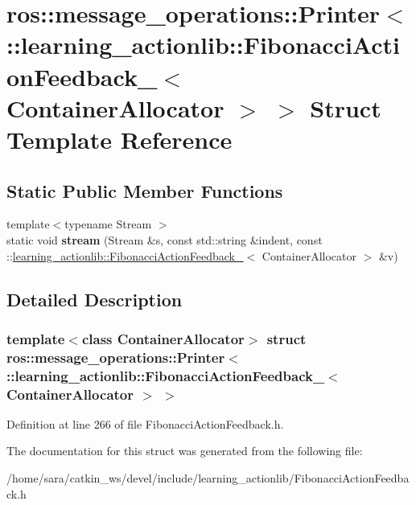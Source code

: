 \hypertarget{structros_1_1message__operations_1_1Printer_3_01_1_1learning__actionlib_1_1FibonacciActionFeedbab10a7c35099a1a330ccb0b34d632cc2e}{}\section{ros\+:\+:message\+\_\+operations\+:\+:Printer$<$ \+:\+:learning\+\_\+actionlib\+:\+:Fibonacci\+Action\+Feedback\+\_\+$<$ Container\+Allocator $>$ $>$ Struct Template Reference}
\label{structros_1_1message__operations_1_1Printer_3_01_1_1learning__actionlib_1_1FibonacciActionFeedbab10a7c35099a1a330ccb0b34d632cc2e}
\subsection*{Static Public Member Functions}
\begin{DoxyCompactItemize}
\item 
\mbox{\label{structros_1_1message__operations_1_1Printer_3_01_1_1learning__actionlib_1_1FibonacciActionFeedbab10a7c35099a1a330ccb0b34d632cc2e_a3f73b3e94f53fbf2d7cbad0ed370ce6e}} 
{\footnotesize template$<$typename Stream $>$ }\\static void {\bfseries stream} (Stream \&s, const std\+::string \&indent, const \+::\hyperlink{structlearning__actionlib_1_1FibonacciActionFeedback__}{learning\+\_\+actionlib\+::\+Fibonacci\+Action\+Feedback\+\_\+}$<$ Container\+Allocator $>$ \&v)
\end{DoxyCompactItemize}


\subsection{Detailed Description}
\subsubsection*{template$<$class Container\+Allocator$>$\newline
struct ros\+::message\+\_\+operations\+::\+Printer$<$ \+::learning\+\_\+actionlib\+::\+Fibonacci\+Action\+Feedback\+\_\+$<$ Container\+Allocator $>$ $>$}



Definition at line 266 of file Fibonacci\+Action\+Feedback.\+h.



The documentation for this struct was generated from the following file\+:\begin{DoxyCompactItemize}
\item 
/home/sara/catkin\+\_\+ws/devel/include/learning\+\_\+actionlib/Fibonacci\+Action\+Feedback.\+h\end{DoxyCompactItemize}
